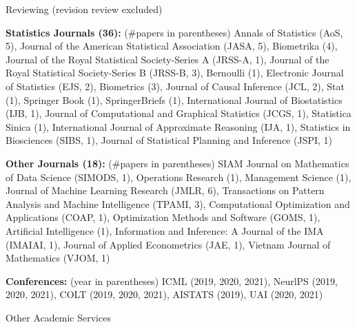 \documentclass{article}
\begin{document}



\vspace{5mm}
\begin{large}
\noindent Reviewing (revision review excluded)
\end{large}

\vspace{2mm}
\noindent \textbf{Statistics Journals (36): }(\#papers in parentheses) Annals of Statistics (AoS, 5), Journal of the American Statistical Association (JASA, 5), Biometrika (4), Journal of the Royal Statistical Society-Series A (JRSS-A, 1), Journal of the Royal Statistical Society-Series B (JRSS-B, 3), Bernoulli (1), Electronic Journal of Statistics (EJS, 2), Biometrics (3), Journal of Causal Inference (JCL, 2), Stat (1), Springer Book (1), SpringerBriefs (1), International Journal of Biostatistics (IJB, 1), Journal of Computational and Graphical Statistics (JCGS, 1), Statistica Sinica (1), International Journal of Approximate Reasoning (IJA, 1), Statistics in Biosciences (SIBS, 1), Journal of Statistical Planning and Inference (JSPI, 1)

\vspace{2mm}
\noindent \textbf{Other Journals (18): }(\#papers in parentheses) SIAM Journal on Mathematics of Data Science (SIMODS, 1), Operations Research (1), Management Science (1), Journal of Machine Learning Research (JMLR, 6), Transactions on Pattern Analysis and Machine Intelligence (TPAMI, 3), Computational Optimization and Applications (COAP, 1), Optimization Methods and Software (GOMS, 1), Artificial Intelligence (1), Information and Inference: A Journal of the IMA (IMAIAI, 1), Journal of Applied Econometrics (JAE, 1), Vietnam Journal of Mathematics (VJOM, 1)

\vspace{2mm}
\noindent \textbf{Conferences: }(year in parentheses) ICML (2019, 2020, 2021), NeurlPS (2019, 2020, 2021), COLT (2019, 2020, 2021), AISTATS (2019), UAI (2020, 2021)

\vspace{5mm}
\begin{large}
\noindent Other Academic Services
\end{large}
\end{document}
